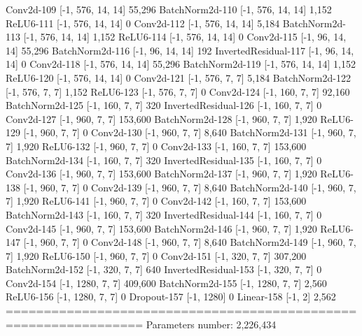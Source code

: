 \documentclass[11pt]{article}
\begin{document}
          Conv2d-109          [-1, 576, 14, 14]          55,296
     BatchNorm2d-110          [-1, 576, 14, 14]           1,152
           ReLU6-111          [-1, 576, 14, 14]               0
          Conv2d-112          [-1, 576, 14, 14]           5,184
     BatchNorm2d-113          [-1, 576, 14, 14]           1,152
           ReLU6-114          [-1, 576, 14, 14]               0
          Conv2d-115           [-1, 96, 14, 14]          55,296
     BatchNorm2d-116           [-1, 96, 14, 14]             192
InvertedResidual-117           [-1, 96, 14, 14]               0
          Conv2d-118          [-1, 576, 14, 14]          55,296
     BatchNorm2d-119          [-1, 576, 14, 14]           1,152
           ReLU6-120          [-1, 576, 14, 14]               0
          Conv2d-121            [-1, 576, 7, 7]           5,184
     BatchNorm2d-122            [-1, 576, 7, 7]           1,152
           ReLU6-123            [-1, 576, 7, 7]               0
          Conv2d-124            [-1, 160, 7, 7]          92,160
     BatchNorm2d-125            [-1, 160, 7, 7]             320
InvertedResidual-126            [-1, 160, 7, 7]               0
          Conv2d-127            [-1, 960, 7, 7]         153,600
     BatchNorm2d-128            [-1, 960, 7, 7]           1,920
           ReLU6-129            [-1, 960, 7, 7]               0
          Conv2d-130            [-1, 960, 7, 7]           8,640
     BatchNorm2d-131            [-1, 960, 7, 7]           1,920
           ReLU6-132            [-1, 960, 7, 7]               0
          Conv2d-133            [-1, 160, 7, 7]         153,600
     BatchNorm2d-134            [-1, 160, 7, 7]             320
InvertedResidual-135            [-1, 160, 7, 7]               0
          Conv2d-136            [-1, 960, 7, 7]         153,600
     BatchNorm2d-137            [-1, 960, 7, 7]           1,920
           ReLU6-138            [-1, 960, 7, 7]               0
          Conv2d-139            [-1, 960, 7, 7]           8,640
     BatchNorm2d-140            [-1, 960, 7, 7]           1,920
           ReLU6-141            [-1, 960, 7, 7]               0
          Conv2d-142            [-1, 160, 7, 7]         153,600
     BatchNorm2d-143            [-1, 160, 7, 7]             320
InvertedResidual-144            [-1, 160, 7, 7]               0
          Conv2d-145            [-1, 960, 7, 7]         153,600
     BatchNorm2d-146            [-1, 960, 7, 7]           1,920
           ReLU6-147            [-1, 960, 7, 7]               0
          Conv2d-148            [-1, 960, 7, 7]           8,640
     BatchNorm2d-149            [-1, 960, 7, 7]           1,920
           ReLU6-150            [-1, 960, 7, 7]               0
          Conv2d-151            [-1, 320, 7, 7]         307,200
     BatchNorm2d-152            [-1, 320, 7, 7]             640
InvertedResidual-153            [-1, 320, 7, 7]               0
          Conv2d-154           [-1, 1280, 7, 7]         409,600
     BatchNorm2d-155           [-1, 1280, 7, 7]           2,560
           ReLU6-156           [-1, 1280, 7, 7]               0
         Dropout-157                 [-1, 1280]               0
          Linear-158                    [-1, 2]           2,562
================================================================
    Parameters number: 2,226,434
\end{document}
